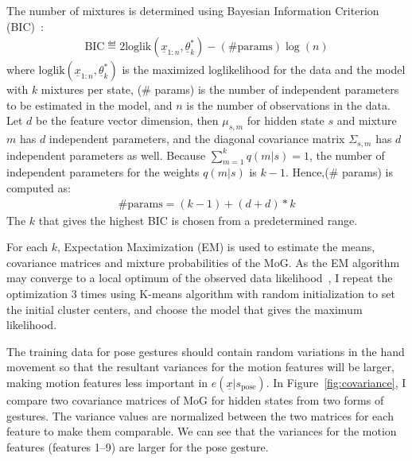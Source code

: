 The number of mixtures is
determined using Bayesian Information Criterion (BIC)~\cite{fraley06}:
\begin{align*}
\text{BIC}\eqdef2\text{loglik}(\underline{x}_{1:n}, \underline{\theta}_k^*) -
(\text{\# params})\log(n)
\end{align*}
where $\text{loglik}(\underline{x}_{1:n}, \underline{\theta}_k^*)$ is the
maximized loglikelihood for the data and the model with $k$ mixtures per state, (\# params) is the number of independent parameters to be estimated in the model, and $n$ is the number of observations in
the data. Let $d$ be the feature vector dimension, then $\mu_{s,m}$ for
hidden state $s$ and mixture $m$ has $d$ independent parameters, and the
diagonal covariance matrix $\Sigma_{s,m}$ has $d$ independent parameters as
well. Because $\sum_{m=1}^k q(m | s) = 1$, the number of independent parameters
for the weights $q(m|s)$ is $k - 1$. Hence,(\# params) is computed as:
\begin{align*}
\text{\# params} = (k - 1) + (d + d) * k
\end{align*}
The $k$ that gives the highest BIC is chosen from a predetermined range.

For each $k$, Expectation Maximization (EM) is used to estimate the means,
covariance matrices and mixture probabilities of the MoG. As the EM algorithm may
converge to a local optimum of the observed data likelihood~\cite{dicintio12}, I
repeat the optimization 3 times using K-means algorithm with random
initialization to set the initial cluster centers, and choose the model that
gives the maximum likelihood.

The training data for pose gestures should contain random variations in the
hand movement so that the resultant variances for the motion features will be
larger, making motion features less important in
$e(\underline{x}|s_{\text{pose}})$. In Figure~\ref{fig:covariance}, I compare
two covariance matrices of MoG for hidden states from two forms of gestures. The
variance values are normalized between the two matrices for each feature to make
them comparable. We can see that the variances for the motion features (features
1--9) are larger for the pose gesture.

